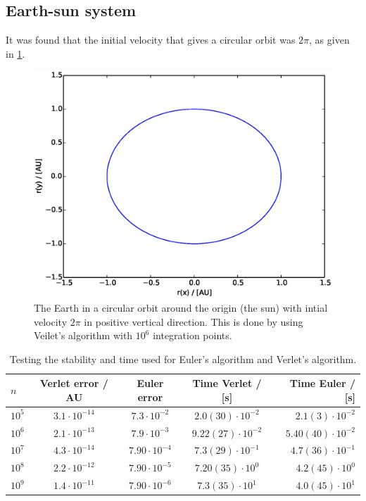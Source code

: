 \documentclass{article}
\begin{document}
\subsection{Earth-sun system}
It was found that the initial velocity that gives a circular orbit was $2\pi$, as given in \ref{jordensbane}.
\begin{figure}[H]
  \includegraphics[scale=0.6]{plots/3c_jordensbane_verlet_n10e6.eps}
  \caption{The Earth in a circular orbit around the origin (the sun) with intial velocity $2\pi$ in positive vertical direction. This is done by using Veilet's algorithm with $10^6$ integration points.}
  \label{jordensbane}
\end{figure}

\begin{table}[H]
    \centering
    \begin{tabular}{|l|c|c|c|r|}
    \hline
     $n$ & Verlet error / AU & Euler error & Time Verlet / [s] & Time Euler / [s]\\
     \hline
      $10^5$  & $3.1\cdot10^{-14}$  & $7.3\cdot10^{-2}$ & $ 2.0 (30) \cdot 10^{-2}$ & $ 2.1 (3) \cdot 10^{-2}$\\
      $10^6$  & $2.1\cdot10^{-13}$  & $7.9\cdot10^{-3}$ & $ 9.22 (27) \cdot 10^{-2}$ & $ 5.40 (40)\cdot 10^{-2}$\\
      $10^7$  & $4.3\cdot10^{-14}$  & $7.90\cdot10^{-4}$ & $ 7.3 (29) \cdot 10^{-1}$ & $ 4.7 (36) \cdot 10^{-1}$\\
      $10^8$  & $2.2\cdot10^{-12}$  & $7.90\cdot10^{-5}$ & $ 7.20 (35) \cdot 10^{0}$ & $ 4.2 (45) \cdot 10^{0}$\\
      $10^9$  & $1.4\cdot10^{-11}$  & $7.90\cdot10^{-6}$ & $ 7.3 (35) \cdot 10^{1}$ & $ 4.0 (45) \cdot 10^{1}$\\
      \hline
    \end{tabular}
    \caption{Testing the stability and time used for Euler's algorithm and Verlet's algorithm.}
    \label{stability}
\end{table}
\end{document}
